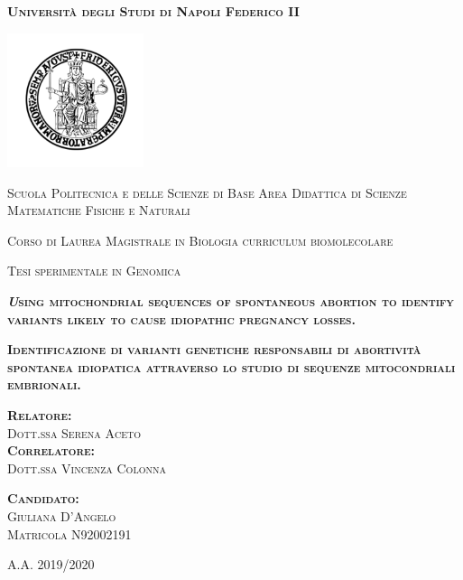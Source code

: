 \documentclass[
11pt, %
oneside, %
english, %
singlespacing, %
headsepline, %
]{MastersDoctoralThesisV2} %
\author{Giuliana D'Angelo }
\date{23 march 2021}
\begin{document}
\begin{titlepage}
\centering
{\scshape\large\normalfont\bfseries Università degli Studi di Napoli Federico II \par}
 \vspace{0.7cm} 
 \includegraphics[width=0.30\textwidth]{Fig/logo.png}
 \par
 \vspace{0.5cm}
\hspace{2cm}
{\scshape\large\normalfont Scuola Politecnica e delle Scienze di Base
\newline
Area Didattica di Scienze Matematiche Fisiche e Naturali
 \par}
 \vspace{0.5cm}
{\scshape\large\normalfont Corso di Laurea Magistrale in Biologia curriculum biomolecolare
 \par}
 \vspace{0.5cm} 
{\scshape\large\normalfont Tesi sperimentale in Genomica
 \par}
  \vspace{0.8cm}
{\scshape\large\normalfont\bfseries\textit Using mitochondrial sequences of spontaneous abortion to identify variants likely to cause idiopathic pregnancy losses.
 \par}
  \vspace{0.8cm}
{\scshape\large\normalfont\bfseries  Identificazione di varianti genetiche  responsabili di abortività spontanea idiopatica attraverso lo studio di sequenze mitocondriali embrionali.
 \par} 
\vspace{0.8cm} 
\begin{minipage}{0.45\textwidth}
{\scshape\normalfont\large\bfseries Relatore:}\\
{\scshape\normalfont\large Dott.ssa Serena Aceto} \\ 
{\scshape\normalfont\large\bfseries Correlatore:} \\
{\scshape\normalfont\large Dott.ssa Vincenza Colonna}\\
\end{minipage}
\hspace{2.5cm}
\begin{minipage}{0.25\textwidth}
{\scshape\normalfont\large\bfseries Candidato:}\\
 {\scshape\normalfont\large Giuliana D'Angelo \\
 Matricola N92002191} 
\end{minipage}
\vfill
\centering
\vspace{0.48cm} 
{\scshape\Large\normalfont A.A. 2019/2020}

\end{titlepage}
\end{document}
